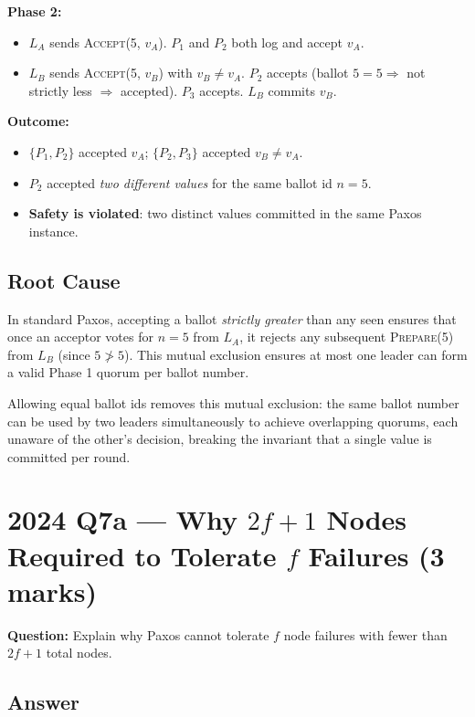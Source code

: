 \documentclass[12pt,a4paper]{article}
\begin{document}
\textbf{Phase 2:}
\begin{itemize}[noitemsep]
  \item $L_A$ sends \textsc{Accept}(5, $v_A$). $P_1$ and $P_2$ both log and accept $v_A$.
  \item $L_B$ sends \textsc{Accept}(5, $v_B$) with $v_B \neq v_A$. $P_2$ accepts (ballot $5 = 5 \Rightarrow$ not strictly less $\Rightarrow$ accepted). $P_3$ accepts. $L_B$ commits $v_B$.
\end{itemize}

\textbf{Outcome:}
\begin{itemize}[noitemsep]
  \item $\{P_1, P_2\}$ accepted $v_A$; $\{P_2, P_3\}$ accepted $v_B \neq v_A$.
  \item $P_2$ accepted \emph{two different values} for the same ballot id $n = 5$.
  \item \textbf{Safety is violated}: two distinct values committed in the same Paxos instance.
\end{itemize}

\subsection*{Root Cause}

In standard Paxos, accepting a ballot \emph{strictly greater} than any seen ensures that once an acceptor votes for $n=5$ from $L_A$, it rejects any subsequent \textsc{Prepare}(5) from $L_B$ (since $5 \not> 5$). This mutual exclusion ensures at most one leader can form a valid Phase 1 quorum per ballot number.

Allowing equal ballot ids removes this mutual exclusion: the same ballot number can be used by two leaders simultaneously to achieve overlapping quorums, each unaware of the other's decision, breaking the invariant that a single value is committed per round.

\section{2024 Q7a --- Why $2f+1$ Nodes Required to Tolerate $f$ Failures (3 marks)}

\textbf{Question:} Explain why Paxos cannot tolerate $f$ node failures with fewer than $2f+1$ total nodes.

\subsection*{Answer}
\end{document}
